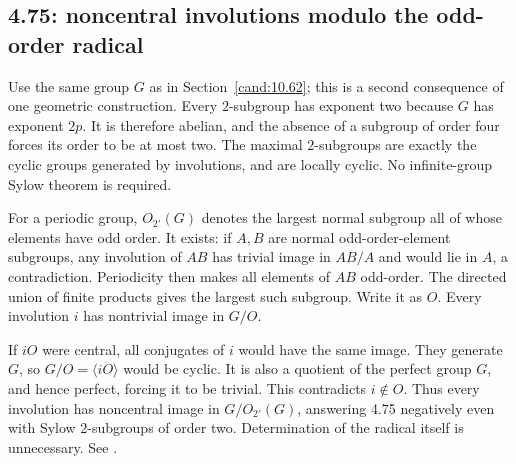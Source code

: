 \subsection{4.75: noncentral involutions modulo the odd-order radical}
\label{cand:4.75}
Use the same group \(G\) as in Section~\ref{cand:10.62}; this is a
second consequence of one geometric construction.
Every \(2\)-subgroup has exponent two because \(G\) has exponent \(2p\).
It is therefore abelian, and the absence of a subgroup of order four
forces its order to be at most two. The maximal \(2\)-subgroups are
exactly the cyclic groups generated by involutions, and are locally
cyclic. No infinite-group Sylow theorem is required.

For a periodic group, \(O_{2'}(G)\) denotes the largest normal subgroup
all of whose elements have odd order. It exists: if \(A,B\) are normal
odd-order-element subgroups, any involution of \(AB\) has trivial image
in \(AB/A\) and would lie in \(A\), a contradiction.
Periodicity then makes all elements of \(AB\) odd-order.
The directed union of finite products gives the largest such subgroup.
Write it as \(O\). Every involution \(i\) has nontrivial image in \(G/O\).

If \(iO\) were central, all conjugates of \(i\) would have the same
image. They generate \(G\), so \(G/O=\langle iO\rangle\) would be
cyclic. It is also a quotient of the perfect group \(G\), and hence
perfect, forcing it to be trivial. This contradicts \(i\notin O\).
Thus every involution has noncentral image in \(G/O_{2'}(G)\), answering
4.75 negatively even with Sylow \(2\)-subgroups of order two.
Determination of the radical itself is unnecessary.
See .
